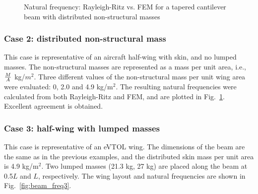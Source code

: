\begin{figure}
     \centering
     \caption{Natural frequency: Rayleigh-Ritz vs. FEM for a tapered cantilever beam with distributed non-structural masses}
     \label{fig:beam_freq2}
\end{figure}

\subsubsection{Case 2: distributed non-structural mass}
This case is representative of an aircraft half-wing with skin, and no lumped masses. The non-structural masses are represented as a mass per unit area, i.e., $\large\frac{M}{A}$ kg/$m^2$. Three different values of the non-structural mass per unit wing area were evaluated: 0, 2.0 and 4.9 kg/m$^2$. The resulting natural frequencies were calculated from both Rayleigh-Ritz and FEM, and are plotted in Fig.~\ref{fig:beam_freq2}. Excellent agreement is obtained.

\subsubsection{Case 3: half-wing with lumped masses}
This case is representative of an eVTOL wing. The dimensions of the beam are the same as in the previous examples, and the distributed skin mass per unit area is 4.9 kg/m$^2$. Two lumped masses (21.3 kg, 27 kg) are placed along the beam at 0.5$L$ and $L$, respectively. The wing layout and natural frequencies are shown in Fig.~\ref{fig:beam_freq3}.

